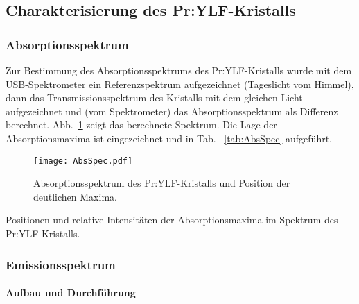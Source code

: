 \subsection{Charakterisierung des Pr:YLF-Kristalls}

\subsubsection{Absorptionsspektrum}

Zur Bestimmung des Absorptionsspektrums des Pr:YLF-Kristalls wurde mit dem USB-Spektrometer ein
Referenzspektrum aufgezeichnet (Tageslicht vom Himmel), dann das Transmissionsspektrum des Kristalls
mit dem gleichen Licht aufgezeichnet und (vom Spektrometer) das Absorptionsspektrum als Differenz
berechnet.
Abb.~\ref{img:AbsSpec} zeigt das berechnete Spektrum.
Die Lage der Absorptionsmaxima ist eingezeichnet und in Tab.~ \ref{tab:AbsSpec} aufgeführt.

\begin{figure}[H]
\begin{center}
  \texttt{[image: AbsSpec.pdf]}
  \caption{Absorptionsspektrum des Pr:YLF-Kristalls und Position der deutlichen Maxima.}
  \label{img:AbsSpec}
\end{center}
\end{figure}

\begin{table}[htb]
\caption{Positionen und relative Intensitäten der Absorptionsmaxima im Spektrum des
Pr:YLF-Kristalls.}

\label{tab:AbsSpec}
\end{table}


\subsubsection{Emissionsspektrum}

\paragraph{Aufbau und Durchführung}

